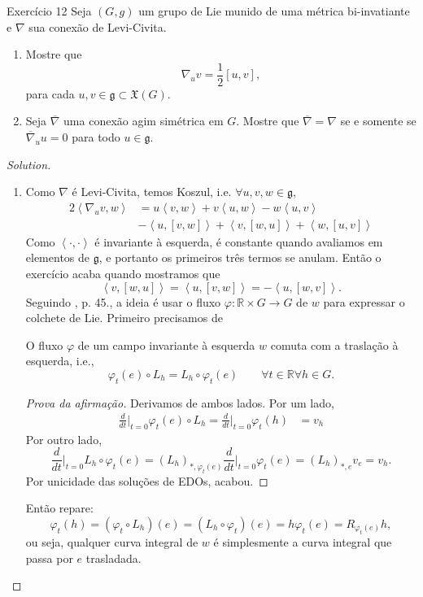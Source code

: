 \begin{thing4}{Exercício 12}\label{exer:12}\leavevmode
Seja \((G,g)\) um grupo de Lie munido de uma métrica bi-invatiante e \(\nabla\) sua conexão de Levi-Civita.
\begin{enumerate}[label=(\alph*)]
\item Mostre que
	\[\nabla_uv=\frac{1}{2}[u,v],\]
	para cada \(u,v \in \mathfrak{g} \subset \mathfrak{X}(G)\).
\item Seja \(\overline{\nabla}\) uma conexão agim simétrica em \(G\). Mostre que \(\overline{\nabla}=\nabla\) se e somente se \(\overline{\nabla}_uu=0\) para todo \(u \in \mathfrak{g}\).
\end{enumerate}
\end{thing4}


\begin{proof}[Solution]\leavevmode
\begin{enumerate}[label=(\alph*)]
\item Como \(\nabla\) é Levi-Civita, temos Koszul, i.e. \(\forall  u,v,w \in \mathfrak{g}\),
	\begin{align*}
	2\left<\nabla_uv,w\right>&=u\left<v,w\right>+v\left<u,w\right>-w\left<u,v\right>\\
				 & -\left<u,[v,w]\right>+\left<v,[w,u]\right>+\left<w,[u,v]\right>
	\end{align*}
	Como \(\left<\cdot,\cdot\right>\) é invariante à esquerda, é constante quando avaliamos em elementos de \(\mathfrak{g}\), e portanto os primeiros três termos se anulam. Então o exercício acaba quando mostramos que
	\[\left<v,[w,u]\right>=\left<u,[v,w]\right>=-\left<u,[w,v]\right>.\]
	Seguindo \cite{doc}, p. 45., a ideia é usar o fluxo \(\varphi:\mathbb{R} \times G\to G\) de \(w\) para expressar o colchete de Lie. Primeiro precisamos de

	\begin{claim}\leavevmode
	O fluxo \(\varphi\) de um campo invariante à esquerda \(w\) comuta com a traslação à esquerda, i.e.,
	\[\varphi_t(e)\circ L_h = L_h \circ \varphi_t(e)\qquad \forall t\in \mathbb{R} \forall h \in G.\]
	\end{claim}
	\begin{proof}[Prova da afirmação]\leavevmode
Derivamos de ambos lados. Por um lado,
\begin{align*}
\frac{d}{dt}\Big|_{t=0}\varphi_t(e) \circ L_h=\frac{d}{dt}\Big|_{t=0}\varphi_t(h)&=v_h\end{align*}
Por outro lado,
\[\frac{d}{dt}\Big|_{t=0}L_h \circ \varphi_t(e)=(L_h)_{*,\varphi_t(e)}\frac{d}{dt}\Big|_{t=0}\varphi_t(e)=(L_h)_{*,e}v_e=v_h.\]
Por unicidade das soluções de EDOs, acabou.
	\end{proof}
Então repare:
\[\varphi_t(h)=(\varphi_t\circ L_h)(e)=(L_h \circ \varphi_t)(e)=h\varphi_t(e)=R_{\varphi_t(e)}h,\]
ou seja, qualquer curva integral de \(w\) é simplesmente a curva integral que passa por \(e\) trasladada.


\end{enumerate}
\end{proof}
